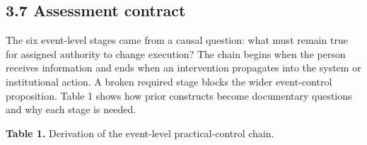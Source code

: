 \documentclass[11pt]{article}
\renewcommand{\arraystretch}{1.10}
\newlength{\TAETableWidth}
\begin{document}
\subsection*{3.7 Assessment contract}

The six event-level stages came from a causal question: what must remain true for assigned authority to change execution? The chain begins when the person receives information and ends when an intervention propagates into the system or institutional action. A broken required stage blocks the wider event-control proposition. Table 1 shows how prior constructs become documentary questions and why each stage is needed.

\label{table-1}
{\small \textcolor{TAENavy}{\textbf{Table 1.}} Derivation of the event-level practical-control chain.\par}
\begingroup
\small
\setlength{\tabcolsep}{4pt}
\renewcommand{\arraystretch}{1.12}
\setlength{\TAETableWidth}{\dimexpr\linewidth-6\tabcolsep\relax}
\end{document}
